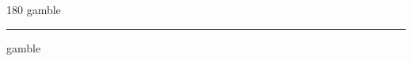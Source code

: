 
\begin{frame}
\begin{center}
\begin{turn}{180}
{\fontsize{2.5cm}{1em}\selectfont gamble}
\end{turn}
\vspace{1em}\par  
\hrule
\vspace{1em}\par  
{\fontsize{2.5cm}{1em}\selectfont gamble}
\end{center}
\end{frame}

